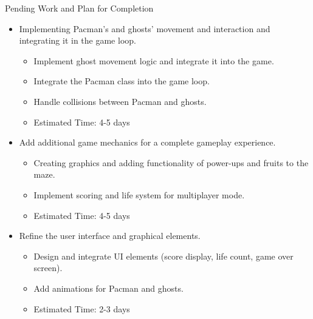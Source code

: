 \documentclass{beamer}
\begin{document}
\begin{frame}{Pending Work and Plan for Completion}
    \begin{itemize}
        \item Implementing Pacman's and ghosts' movement and interaction and integrating it in the game loop.
            \begin{itemize}
                \item Implement ghost movement logic and integrate it into the game.
                \item Integrate the Pacman class into the game loop.
                \item Handle collisions between Pacman and ghosts.
		\item Estimated Time: 4-5 days
            \end{itemize}
        
        \item Add additional game mechanics for a complete gameplay experience.
            \begin{itemize}
                \item Creating graphics and adding functionality of power-ups and fruits to the maze.
                \item Implement scoring and life system for multiplayer mode.
		\item Estimated Time: 4-5 days
            \end{itemize}
        
        \item Refine the user interface and graphical elements.
            \begin{itemize}
                \item Design and integrate UI elements (score display, life count, game over screen).
                \item Add animations for Pacman and ghosts.
		\item Estimated Time: 2-3 days
            \end{itemize}
    \end{itemize}
\end{frame}
\end{document}

